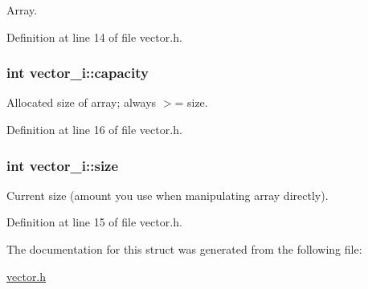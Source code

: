 Array. 



Definition at line 14 of file vector.h.

\hypertarget{structvector__i_af108aa670ac888975024a428c31f27fc}{
\subsubsection[{capacity}]{\setlength{\rightskip}{0pt plus 5cm}int {\bf vector\_\-i::capacity}}}
\label{structvector__i_af108aa670ac888975024a428c31f27fc}


Allocated size of array; always $>$= size. 



Definition at line 16 of file vector.h.

\hypertarget{structvector__i_a04afc9e861d169d920fc8d2a26b670cd}{
\subsubsection[{size}]{\setlength{\rightskip}{0pt plus 5cm}int {\bf vector\_\-i::size}}}
\label{structvector__i_a04afc9e861d169d920fc8d2a26b670cd}


Current size (amount you use when manipulating array directly). 



Definition at line 15 of file vector.h.



The documentation for this struct was generated from the following file:\begin{DoxyCompactItemize}
\item 
\hyperlink{vector_8h}{vector.h}\end{DoxyCompactItemize}
